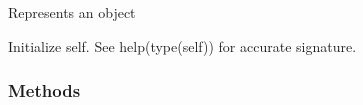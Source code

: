 \documentclass[letterpaper,10pt,english,openany,oneside]{sphinxmanual}
\begin{document}
\begin{fulllineitems}
\label{\detokenize{reference/classes/generated/spydrnet.ir.Element:spydrnet.ir.Element}}
Represents an object

\begin{fulllineitems}
\label{\detokenize{reference/classes/generated/spydrnet.ir.Element:spydrnet.ir.Element.__init__}}
Initialize self.  See help(type(self)) for accurate signature.

\end{fulllineitems}

\subsubsection*{Methods}


\begin{savenotes}\sphinxatlongtablestart\begin{longtable}[c]{}
\hline

\endfirsthead

%
{}\\
\hline

\endhead

\hline
{}\\
\endfoot

\endlastfoot


\end{longtable}
\end{savenotes}
\end{fulllineitems}
\end{document}
